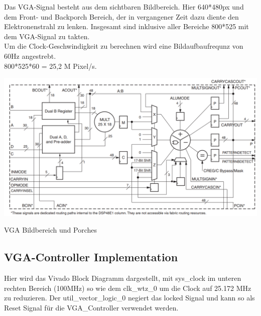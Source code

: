 Das VGA-Signal besteht aus dem sichtbaren Bildbereich. Hier 640*480px und dem Front- und Backporch Bereich, der in vergangener 
Zeit dazu diente den Elektronenstrahl zu lenken. Insgesamt sind inklusive aller Bereiche 800*525 mit dem VGA-Signal zu takten.\\
Um die Clock-Geschwindigkeit zu berechnen wird eine Bildaufbaufrequnz von 60Hz angestrebt. \\
800*525*60 = 25,2 M Pixel/s.\\

\begin{minipage}{\textwidth}
    \begin{center}        
        \includegraphics[scale=0.5]{img/DSP48e.png} 
    \end{center}
\end{minipage}
\begin{center}
VGA Bildbereich und Porches
\end{center}

\subsection{VGA-Controller Implementation}
Hier wird das Vivado Block Diagramm dargestellt, mit sys\_clock im unteren rechten Bereich (100MHz) so wie dem clk\_wtz\_0 um 
die Clock auf 25.172 MHz zu reduzieren. Der util\_vector\_logic\_0 negiert das locked Signal und kann so als Reset Signal für die VGA\_Controller verwendet werden.\\

